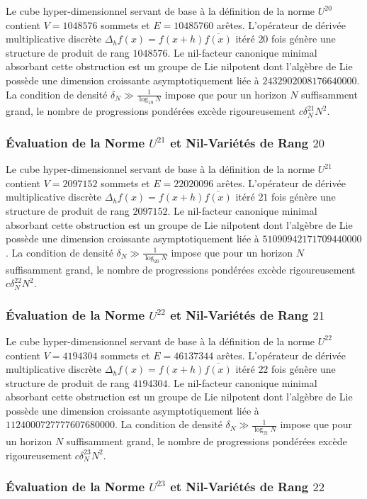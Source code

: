 \documentclass[11pt,a4paper]{article}
\begin{document}
Le cube hyper-dimensionnel servant de base à la définition de la norme $U^{20}$ contient $V = 1048576$ sommets et $E = 10485760$ arêtes. L'opérateur de dérivée multiplicative discrète $\Delta_h f(x) = f(x+h)\overline{f(x)}$ itéré $20$ fois génère une structure de produit de rang $1048576$. Le nil-facteur canonique minimal absorbant cette obstruction est un groupe de Lie nilpotent dont l'algèbre de Lie possède une dimension croissante asymptotiquement liée à $2432902008176640000$. La condition de densité $\delta_N \gg \frac{1}{\log_{19} N}$ impose que pour un horizon $N$ suffisamment grand, le nombre de progressions pondérées excède rigoureusement $c \delta_N^{21} N^2$. \subsubsection{Évaluation de la Norme $U^{21}$ et Nil-Variétés de Rang $20$}
Le cube hyper-dimensionnel servant de base à la définition de la norme $U^{21}$ contient $V = 2097152$ sommets et $E = 22020096$ arêtes. L'opérateur de dérivée multiplicative discrète $\Delta_h f(x) = f(x+h)\overline{f(x)}$ itéré $21$ fois génère une structure de produit de rang $2097152$. Le nil-facteur canonique minimal absorbant cette obstruction est un groupe de Lie nilpotent dont l'algèbre de Lie possède une dimension croissante asymptotiquement liée à $51090942171709440000$. La condition de densité $\delta_N \gg \frac{1}{\log_{20} N}$ impose que pour un horizon $N$ suffisamment grand, le nombre de progressions pondérées excède rigoureusement $c \delta_N^{22} N^2$. \subsubsection{Évaluation de la Norme $U^{22}$ et Nil-Variétés de Rang $21$}
Le cube hyper-dimensionnel servant de base à la définition de la norme $U^{22}$ contient $V = 4194304$ sommets et $E = 46137344$ arêtes. L'opérateur de dérivée multiplicative discrète $\Delta_h f(x) = f(x+h)\overline{f(x)}$ itéré $22$ fois génère une structure de produit de rang $4194304$. Le nil-facteur canonique minimal absorbant cette obstruction est un groupe de Lie nilpotent dont l'algèbre de Lie possède une dimension croissante asymptotiquement liée à $1124000727777607680000$. La condition de densité $\delta_N \gg \frac{1}{\log_{21} N}$ impose que pour un horizon $N$ suffisamment grand, le nombre de progressions pondérées excède rigoureusement $c \delta_N^{23} N^2$. \subsubsection{Évaluation de la Norme $U^{23}$ et Nil-Variétés de Rang $22$}
\end{document}
